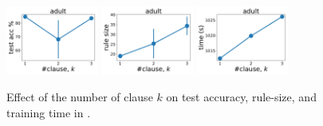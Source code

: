 \begin{figure}[t]
	\subfloat
	{\includegraphics[width=0.27\textwidth]{figures/interpretability/relaxed-cnf/adult_test_accuracy_vary_clause.pdf}}
	\subfloat
	{\includegraphics[width=0.27\textwidth]{figures/interpretability/relaxed-cnf/adult_rule_size_vary_clause.pdf}}
	\subfloat
	{\includegraphics[width=0.27\textwidth]{figures/interpretability/relaxed-cnf/adult_time_vary_clause.pdf}} 
	\\
	
	
	\caption[Effect of the number of clause $ k $ in {\crr}]{Effect of the number of clause $ k $ on test accuracy, rule-size, and training time in {\crr}. } 
	\label{interpretability_crr_fig:result_clause}
\end{figure}



